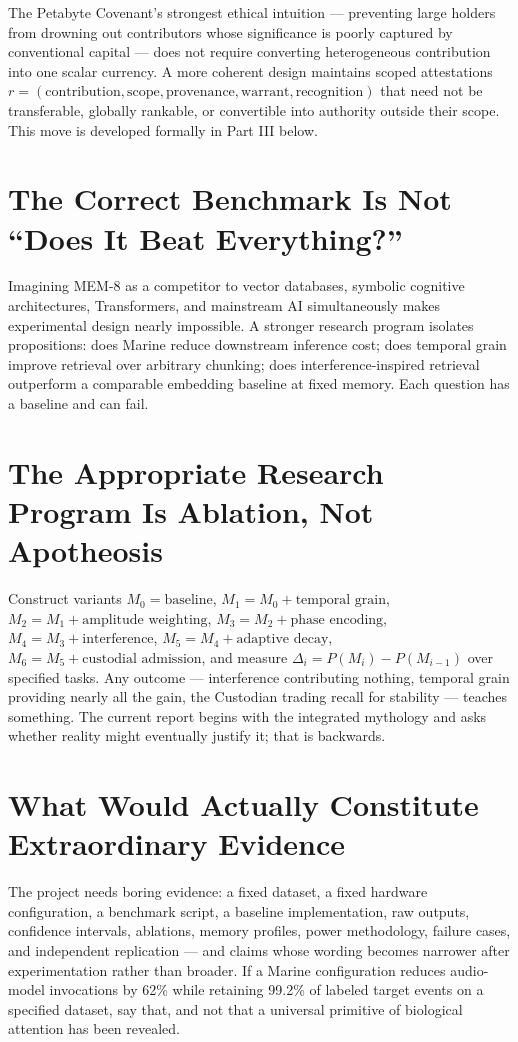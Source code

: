 \documentclass[12pt]{article}
\begin{document}
The Petabyte Covenant's strongest ethical intuition — preventing large holders from drowning out contributors whose significance is poorly captured by conventional capital — does not require converting heterogeneous contribution into one scalar currency. A more coherent design maintains scoped attestations $r=(\text{contribution},\text{scope},\text{provenance},\text{warrant},\text{recognition})$ that need not be transferable, globally rankable, or convertible into authority outside their scope. This move is developed formally in Part III below.

\section{The Correct Benchmark Is Not ``Does It Beat Everything?''}

Imagining MEM-8 as a competitor to vector databases, symbolic cognitive architectures, Transformers, and mainstream AI simultaneously makes experimental design nearly impossible. A stronger research program isolates propositions: does Marine reduce downstream inference cost; does temporal grain improve retrieval over arbitrary chunking; does interference-inspired retrieval outperform a comparable embedding baseline at fixed memory. Each question has a baseline and can fail.

\section{The Appropriate Research Program Is Ablation, Not Apotheosis}

Construct variants $M_0=\text{baseline}$, $M_1=M_0+\text{temporal grain}$, $M_2=M_1+\text{amplitude weighting}$, $M_3=M_2+\text{phase encoding}$, $M_4=M_3+\text{interference}$, $M_5=M_4+\text{adaptive decay}$, $M_6=M_5+\text{custodial admission}$, and measure $\Delta_i=P(M_i)-P(M_{i-1})$ over specified tasks. Any outcome — interference contributing nothing, temporal grain providing nearly all the gain, the Custodian trading recall for stability — teaches something. The current report begins with the integrated mythology and asks whether reality might eventually justify it; that is backwards.

\section{What Would Actually Constitute Extraordinary Evidence}

The project needs boring evidence: a fixed dataset, a fixed hardware configuration, a benchmark script, a baseline implementation, raw outputs, confidence intervals, ablations, memory profiles, power methodology, failure cases, and independent replication — and claims whose wording becomes narrower after experimentation rather than broader. If a Marine configuration reduces audio-model invocations by 62\% while retaining 99.2\% of labeled target events on a specified dataset, say that, and not that a universal primitive of biological attention has been revealed.
\end{document}
